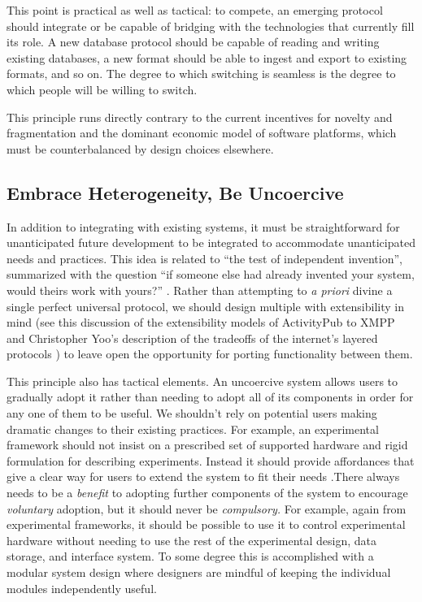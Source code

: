 This point is practical as well as tactical: to compete, an emerging
protocol should integrate or be capable of bridging with the
technologies that currently fill its role. A new database protocol
should be capable of reading and writing existing databases, a new
format should be able to ingest and export to existing formats, and so
on. The degree to which switching is seamless is the degree to which
people will be willing to switch.

This principle runs directly contrary to the current incentives for
novelty and fragmentation and the dominant economic model of software
platforms, which must be counterbalanced by design choices elsewhere.

\hypertarget{embrace-heterogeneity-be-uncoercive}{%
\subsection{Embrace Heterogeneity, Be
Uncoercive}\label{embrace-heterogeneity-be-uncoercive}}

In addition to integrating with existing systems, it must be
straightforward for unanticipated future development to be integrated to
accommodate unanticipated needs and practices. This idea is related to
``the test of independent invention'', summarized with the question ``if
someone else had already invented your system, would theirs work with
yours?'' \citep{berners-leePrinciplesDesign1998} . Rather than
attempting to \emph{a priori} divine a single perfect universal
protocol, we should design multiple with extensibility in mind (see this
discussion of the extensibility models of ActivityPub to XMPP \citep{schubertActivityPubFinalThoughts2019}  and Christopher Yoo's
description of the tradeoffs of the internet's layered protocols \citep{yooProtocolLayeringInternet2013} ) to leave open the opportunity
for porting functionality between them.

This principle also has tactical elements. An uncoercive system allows
users to gradually adopt it rather than needing to adopt all of its
components in order for any one of them to be useful. We shouldn't rely
on potential users making dramatic changes to their existing practices.
For example, an experimental framework should not insist on a prescribed
set of supported hardware and rigid formulation for describing
experiments. Instead it should provide affordances that give a clear way
for users to extend the system to fit their needs \citep{carpenterRFC1958Architectural1996} .There always needs to be a
\emph{benefit} to adopting further components of the system to encourage
\emph{voluntary} adoption, but it should never be \emph{compulsory.} For
example, again from experimental frameworks, it should be possible to
use it to control experimental hardware without needing to use the rest
of the experimental design, data storage, and interface system. To some
degree this is accomplished with a modular system design where designers
are mindful of keeping the individual modules independently useful.

